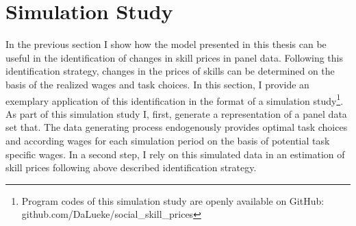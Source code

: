 \documentclass[../main.tex]{subfiles}
\begin{document}
\section{Simulation Study}\label{sec:simulation_study}
In the previous section I show how the model presented in this thesis can be useful in the identification of changes in skill prices in panel data. Following this identification strategy, changes in the prices of skills can be determined on the basis of the realized wages and task choices. In this section, I provide an exemplary application of this identification in the format of a simulation study\footnote{Program codes of this simulation study are openly available on GitHub: github.com/DaLueke/social\_skill\_prices}. 
\\
As part of this simulation study I, first, generate a representation of a panel data set that. The data generating process endogenously provides optimal task choices and according wages for each simulation period on the basis of potential task specific wages. In a second step, I rely on this simulated data in an estimation of skill prices following above described identification strategy.
\end{document}
